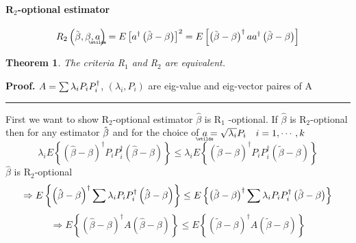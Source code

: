 \documentclass{article}
\newtheorem{theorem}{Theorem}
\newenvironment{proof}[1][Proof]{\noindent\textbf{#1.} }{\ \rule{0.5em}{0.5em}}
\begin{document}
\paragraph{R$_{2}$-optional estimator}

\begin{equation*}
R_{2}\left( \tilde{\beta},\beta ,%
\underaccent{\wtilde}{a}%
\right) =E\left[ a^{\dagger }\left( \tilde{\beta}-\beta \right) \right]
^{2}=E\left[ \left( \tilde{\beta}-\beta \right) ^{\dagger }aa^{\dagger
}\left( \tilde{\beta}-\beta \right) \right]
\end{equation*}

\begin{theorem}
The criteria R$_{1}$ and R$_{2}$ are equivalent.
\end{theorem}

\begin{proof}
$A=\tsum \lambda _{i}P_{i}P_{i}^{\dagger }$, $\left( \lambda
_{i},P_{i}\right) $ are eig-value and eig-vector paires of A
\end{proof}

First we want to show R$_{2}$-optional estimator $\hat{\beta}$ is R$_{1}$%
-optional. If $\hat{\beta}$ is R$_{2}$-optional then for any estimator $\hat{%
\beta}$ and for the choice of $%
\underaccent{\wtilde}{a}%
=\sqrt{\lambda _{i}}P_{i}\quad i=1,\cdots ,k$%
\begin{equation*}
\lambda _{i}E\left\{ \left( \hat{\beta}-\beta \right) ^{\dagger
}P_{i}P_{i}^{\dagger }\left( \hat{\beta}-\beta \right) \right\} \leq \lambda
_{i}E\left\{ \left( \tilde{\beta}-\beta \right) ^{\dagger
}P_{i}P_{i}^{\dagger }\left( \tilde{\beta}-\beta \right) \right\}
\end{equation*}%
$\hat{\beta}$ is R$_{2}$-optional%
\begin{equation*}
\Rightarrow E\left\{ \left( \hat{\beta}-\beta \right) ^{\dagger }\dsum
\lambda _{i}P_{i}P_{i}^{\dagger }\left( \hat{\beta}-\beta \right) \right\}
\leq E\left\{ \left( \tilde{\beta}-\beta \right) ^{\dagger }\dsum \lambda
_{i}P_{i}P_{i}^{\dagger }\left( \tilde{\beta}-\beta \right) \right\}
\end{equation*}%
\begin{equation*}
\Rightarrow E\left\{ \left( \hat{\beta}-\beta \right) ^{\dagger }A\left( 
\hat{\beta}-\beta \right) \right\} \leq E\left\{ \left( \tilde{\beta}-\beta
\right) ^{\dagger }A\left( \tilde{\beta}-\beta \right) \right\}
\end{equation*}
\end{document}
